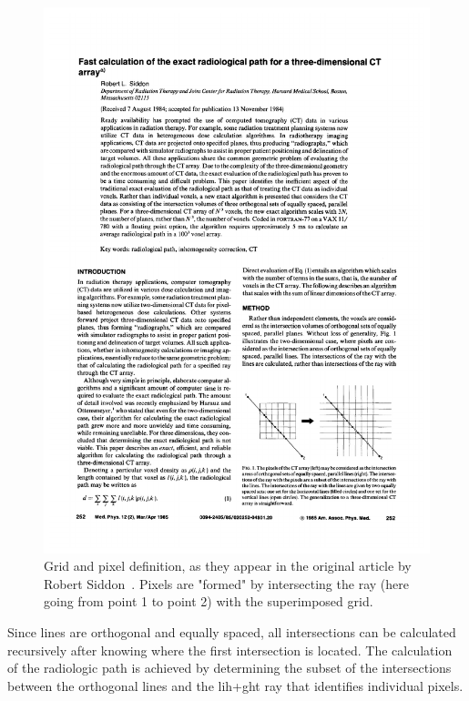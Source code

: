 \begin{figure}[htpb]
    \centering
    \includegraphics[trim=11cm 5cm 2cm 20cm, clip]{img/pdf/siddon_pg1.pdf}
    \caption{Grid and pixel definition, as they appear in the original
        article by Robert Siddon~\cite{Siddon1985}.  Pixels are "formed"
        by intersecting the ray (here going from point 1 to point 2)
        with the superimposed grid.}
    \label{fig:siddon_pixels}
\end{figure}

Since lines are orthogonal and equally spaced, all intersections can be
calculated recursively after knowing where the first intersection is
located. The calculation of the radiologic path is achieved by
determining the subset of the intersections between the orthogonal lines
and the lih+ght ray that identifies individual pixels.

